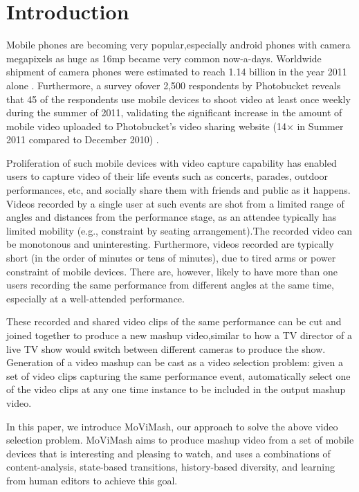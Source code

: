 \documentclass{sig-alternate}
\begin{document}



\section{Introduction}
Mobile phones are becoming very popular,especially android phones with camera megapixels as huge as 16mp became very common now-a-days. Worldwide shipment of camera phones were estimated to reach
1.14 billion in the year 2011 alone \cite{1}. Furthermore, a survey ofover 2,500 respondents by Photobucket reveals that 45 of the respondents use mobile devices to shoot video at least once weekly during the summer of 2011, validating the significant increase in the amount of mobile video uploaded to Photobucket’s video sharing website (14× in Summer 2011 compared to December 2010) \cite{2}.

Proliferation of such mobile devices with video capture capability has enabled users to capture video of their life events such as concerts, parades, outdoor performances, etc, and socially share them with friends and public as it happens. Videos recorded by a single user at such events are shot from a limited range of angles and distances from the performance stage, as an attendee typically has limited mobility (e.g., constraint by seating arrangement).The recorded video can be monotonous and uninteresting. Furthermore, videos recorded are typically short (in the order of minutes or tens of minutes), due to tired arms or power constraint of mobile devices. There are, however, likely to have more than one users recording the same performance from different angles at the same time, especially at a well-attended performance.

These recorded and shared video clips of the same performance can be cut and joined together to produce a new mashup video,similar to how a TV director of a live TV show would switch between different cameras to produce the show. Generation of a video mashup can be cast as a video selection problem: given a set of video clips capturing the same performance event, automatically select one of the video clips at any one time instance to be included in the output mashup video.

In this paper, we introduce MoViMash, our approach to solve the above video selection problem. MoViMash aims to produce mashup video from a set of mobile devices that is interesting and pleasing to watch, and uses a combinations of content-analysis, state-based transitions, history-based diversity, and learning from human editors to achieve this goal.
\end{document}
